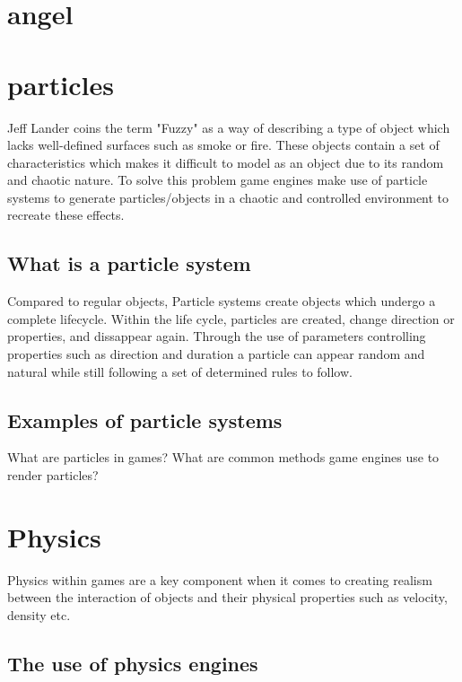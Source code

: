 \documentclass{article} %
\begin{document}
\newpage

\section{angel}
\section{particles}

Jeff Lander coins the term "Fuzzy" as a way of describing a type of object which lacks well-defined surfaces such as smoke or fire. \cite{Lander_1998} These objects contain a set of characteristics which makes it difficult to model as an object due to its random and chaotic nature. To solve this problem game engines make use of particle systems to generate particles/objects in a chaotic and controlled environment to recreate these effects.

\subsection{What is a particle system}

Compared to regular objects, Particle systems create objects which undergo a complete lifecycle. Within the life cycle, particles are created, change direction or properties, and dissappear again. Through the use of parameters controlling properties such as direction and duration a particle can appear random and natural while still following a set of determined rules to follow.

\subsection{Examples of particle systems}



What are particles in games?
What are common methods game engines use to render particles?

\newpage

\section{Physics}

Physics within games are a key component when it comes to creating realism between the interaction of objects and their physical properties such as velocity, density etc. 

\subsection{The use of physics engines}
\end{document}
